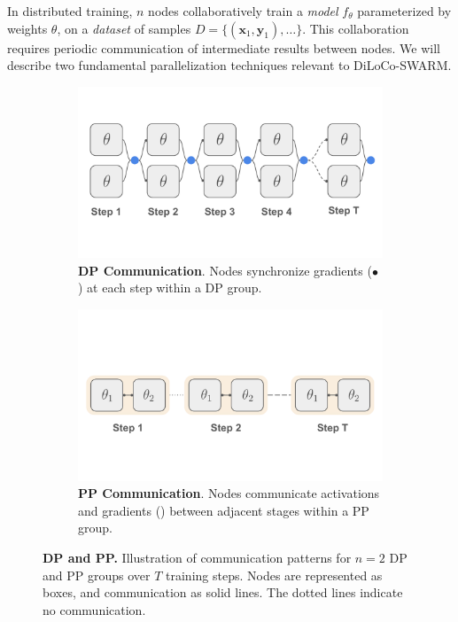 \documentclass{article}
\newcommand{\orangebox}{\colorbox{oorange!50}{\hspace{0.3em}}}
\newcommand{\bluecircle}{\textcolor{bblue}{\LARGE$\bullet$}}
\begin{document}
In distributed training, $n$ nodes collaboratively train a \textit{model} $f_{\theta}$ parameterized by weights $\theta$, on a \textit{dataset} of samples $D = \{(\mathbf{x}_1, \mathbf{y}_1),\dots\}$. This collaboration requires periodic communication of intermediate results between nodes. We will describe two fundamental parallelization techniques relevant to DiLoCo-SWARM.

\begin{figure}[ht]
    \centering
    \begin{subfigure}[b]{0.48\textwidth}
        \centering
        \vspace{0.5cm}
        \includegraphics[width=\textwidth]{figures/dp.pdf}
        \caption{\textbf{DP Communication}. Nodes synchronize gradients (\bluecircle) at each step within a DP group.}
        \label{fig:dp}
    \end{subfigure}
    \hfill
    \begin{subfigure}[b]{0.45\textwidth}
        \centering
        \vspace{0.5cm}
        \includegraphics[width=\textwidth]{figures/pp.pdf}
        \caption{\textbf{PP Communication}. Nodes communicate activations and gradients (\orangebox) between adjacent stages within a PP group.}
        \label{fig:pp}
    \end{subfigure}
    \caption{\textbf{DP and PP.} Illustration of communication patterns for $n=2$ DP and PP groups over $T$ training steps. Nodes are represented as boxes, and communication as solid lines. The dotted lines indicate no communication.}
\end{figure}
\end{document}
